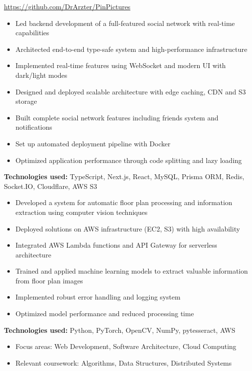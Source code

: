 \documentclass[10pt,a4paper,ragged2e,withhyper]{altacv}
\begin{document}
\makeheader{}

\begin{paracol}{2}
\begin{leftcolumn}
\url{https://github.com/DrArzter/PinPictures}
\begin{itemize}
\item Led backend development of a full-featured social network with real-time capabilities
\item Architected end-to-end type-safe system and high-performance infrastructure
\item Implemented real-time features using WebSocket and modern UI with dark/light modes
\item Designed and deployed scalable architecture with edge caching, CDN and S3 storage
\item Built complete social network features including friends system and notifications
\item Set up automated deployment pipeline with Docker
\item Optimized application performance through code splitting and lazy loading
\end{itemize}
\textbf{Technologies used:} TypeScript, Next.js, React, MySQL, Prisma ORM, Redis, Socket.IO, Cloudflare, AWS S3

\divider

\begin{itemize}
\item Developed a system for automatic floor plan processing and information extraction using computer vision techniques
\item Deployed solutions on AWS infrastructure (EC2, S3) with high availability
\item Integrated AWS Lambda functions and API Gateway for serverless architecture
\item Trained and applied machine learning models to extract valuable information from floor plan images
\item Implemented robust error handling and logging system
\item Optimized model performance and reduced processing time
\end{itemize}
\textbf{Technologies used:} Python, PyTorch, OpenCV, NumPy, pytesseract, AWS

\divider

\begin{itemize}
\item Focus areas: Web Development, Software Architecture, Cloud Computing
\item Relevant coursework: Algorithms, Data Structures, Distributed Systems
\end{itemize}


\end{leftcolumn}
\end{paracol}
\end{document}
